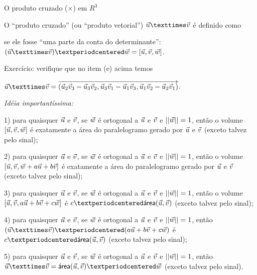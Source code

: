 \documentclass[oneside]{book}
\begin{document}



\newpage

%

 {O produto cruzado ($×$) em $R^3$}

\ssk

\def\area{\textsf{área}}

O ``produto cruzado'' (ou ``produto vetorial'') $\uu×\vv$ é definido como

se ele fosse ``uma parte da conta do determinante'': $(\uu×\vv)·\ww = [\uu,\vv,\ww]$.

Exercício: verifique que no item (e) acima temos

$\uu×\vv = \V(\uu_2\vv_3-\uu_3\vv_2, \uu_3\vv_1-\uu_1\vv_3, \uu_1\vv_2-\uu_2\vv_1)$.

\msk

{\sl Idéia importantíssima:}

1) para quaisquer ${\vec u}$ e ${\vec v}$, se ${\vec w}$ é ortogonal a ${\vec u}$ e ${\vec v}$
e $||{\vec w}||=1$, então o volume $[{\vec u},{\vec v},{\vec w}]$ é exatamente a área do
paralelogramo gerado por ${\vec u}$ e ${\vec v}$ (exceto talvez pelo sinal);

2) para quaisquer ${\vec u}$ e ${\vec v}$, se ${\vec w}$ é ortogonal a ${\vec u}$ e ${\vec v}$
e $||{\vec w}||=1$, então o volume $[{\vec u},{\vec v},{\vec w}+a{\vec u}+b{\vec v}]$ é exatamente a
área do paralelogramo gerado por ${\vec u}$ e ${\vec v}$ (exceto talvez pelo
sinal);

3) para quaisquer ${\vec u}$ e ${\vec v}$, se ${\vec w}$ é ortogonal a ${\vec u}$ e ${\vec v}$
e $||{\vec w}||=1$, então o volume $[{\vec u},{\vec v},a{\vec u}+b{\vec v}+c{\vec w}]$ é
$c·\area(\uu,\vv)$ (exceto talvez pelo sinal);

4) para quaisquer ${\vec u}$ e ${\vec v}$, se ${\vec w}$ é ortogonal a ${\vec u}$ e ${\vec v}$
e $||{\vec w}||=1$, então $(\uu×\vv)·(a\uu+b\vv+c\ww)$ é $c·\area(\uu,\vv)$
(exceto talvez pelo sinal);

5) para quaisquer ${\vec u}$ e ${\vec v}$, se ${\vec w}$ é ortogonal a ${\vec u}$ e ${\vec v}$
e $||{\vec w}||=1$, então $\uu×\vv = \area(\uu,\vv)·\ww$ (exceto talvez
pelo sinal).

\msk
\end{document}

